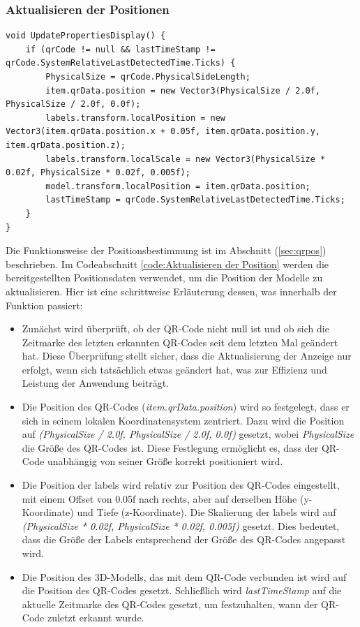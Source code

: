 \begin{itemize}
\subsubsection*{Aktualisieren der Positionen}
\begin{lstlisting}[style=csharp, caption={Aktualisieren der Position}, label=code:Aktualisieren der Position]
void UpdatePropertiesDisplay() {
    if (qrCode != null && lastTimeStamp != qrCode.SystemRelativeLastDetectedTime.Ticks) {
        PhysicalSize = qrCode.PhysicalSideLength;
        item.qrData.position = new Vector3(PhysicalSize / 2.0f, PhysicalSize / 2.0f, 0.0f);
        labels.transform.localPosition = new Vector3(item.qrData.position.x + 0.05f, item.qrData.position.y, item.qrData.position.z);
        labels.transform.localScale = new Vector3(PhysicalSize * 0.02f, PhysicalSize * 0.02f, 0.005f);
        model.transform.localPosition = item.qrData.position;
        lastTimeStamp = qrCode.SystemRelativeLastDetectedTime.Ticks;
    }
}
\end{lstlisting}
Die Funktionsweise der Positionsbestimmung ist im Abschnitt (\ref{sec:qrpos}) beschrieben. Im Codeabschnitt \ref{code:Aktualisieren der Position} werden die bereitgestellten Positionsdaten verwendet, um die Position der Modelle zu aktualisieren. Hier ist eine schrittweise Erläuterung dessen, was innerhalb der Funktion passiert:
\begin{itemize}
    \item Zunächst wird überprüft, ob der QR-Code nicht null ist und ob sich die Zeitmarke des letzten erkannten QR-Codes seit dem letzten Mal geändert hat. Diese Überprüfung stellt sicher, dass die Aktualisierung der Anzeige nur erfolgt, wenn sich tatsächlich etwas geändert hat, was zur Effizienz und Leistung der Anwendung beiträgt.
    \item Die Position des QR-Codes (\textit{item.qrData.position}) wird so festgelegt, dass er sich in seinem lokalen Koordinatensystem zentriert. Dazu wird die Position auf \textit{(PhysicalSize / 2.0f, PhysicalSize / 2.0f, 0.0f)} gesetzt, wobei \textit{PhysicalSize} die Größe des QR-Codes ist. Diese Festlegung ermöglicht es, dass der QR-Code unabhängig von seiner Größe korrekt positioniert wird.
    \item Die Position der labels wird relativ zur Position des QR-Codes eingestellt, mit einem Offset von 0.05f nach rechts, aber auf derselben Höhe (y-Koordinate) und Tiefe (z-Koordinate). Die Skalierung der labels wird auf \textit{(PhysicalSize * 0.02f, PhysicalSize * 0.02f, 0.005f)} gesetzt. Dies bedeutet, dass die Größe der Labels entsprechend der Größe des QR-Codes angepasst wird.
    \item Die Position des 3D-Modells, das mit dem QR-Code verbunden ist wird auf die Position des QR-Codes gesetzt. Schließlich wird \textit{lastTimeStamp} auf die aktuelle Zeitmarke des QR-Codes gesetzt, um festzuhalten, wann der QR-Code zuletzt erkannt wurde.
\end{itemize}


\end{itemize}
